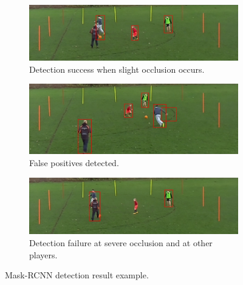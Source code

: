 \documentclass{article}
\begin{document}
\begin{figure}[h!]
  \begin{subfigure}[b]{\linewidth}
  \centering
    \includegraphics[scale=0.2]{report/pic/3_new/det_occlu.jpg}
    \caption{Detection success when slight occlusion occurs.}
  \end{subfigure}
  \begin{subfigure}[b]{\linewidth}
  \centering
    \includegraphics[scale=0.2]{report/pic/3_new/false_posi.jpg} 
    \caption{False positives detected.}
  \end{subfigure}
  \begin{subfigure}[b]{\linewidth}
  \centering
    \includegraphics[scale=0.2]{report/pic/3_new/failure.jpg} 
    \caption{Detection failure at severe occlusion and at other players.}
  \end{subfigure}
  \caption{Mask-RCNN detection result example.}
\end{figure}
\end{document}

